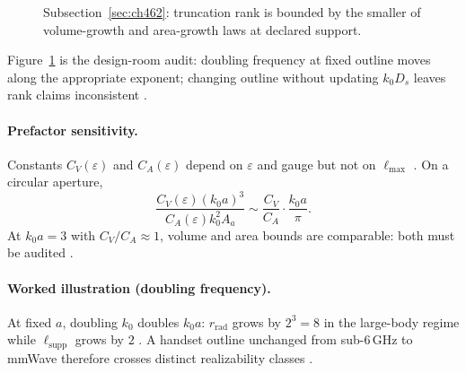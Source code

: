 \begin{figure}[t]
\centering
{}
\caption{Subsection~\ref{sec:ch462}: truncation rank is bounded by the smaller of volume-growth and area-growth laws at declared support.}
\label{fig:ch4.truncation-scaling-audit}
\end{figure}

Figure~\ref{fig:ch4.truncation-scaling-audit} is the design-room audit: doubling frequency at fixed outline moves along the appropriate
exponent; changing outline without updating \(k_{0}D_{s}\) leaves rank claims inconsistent \cite{jackson1999,harrington2001}.

\paragraph{Prefactor sensitivity.}
Constants \(C_{V}(\varepsilon)\) and \(C_{A}(\varepsilon)\) depend on \(\varepsilon\) and gauge but not on \(\ell_{\max}\)
\cite{hansen1988,stratton1941}. On a circular aperture,
\begin{equation}
\label{eq:ch4.scaling-ratio}
\frac{C_{V}(\varepsilon)(k_{0}a)^{3}}{C_{A}(\varepsilon)k_{0}^{2}A_{a}}
\sim
\frac{C_{V}}{C_{A}}\cdot\frac{k_{0}a}{\pi}.
\end{equation}
At \(k_{0}a=3\) with \(C_{V}/C_{A}\approx1\), volume and area bounds are comparable: both must be audited \cite{harrington2001,devaney2004}.

\paragraph{Worked illustration (doubling frequency).}
At fixed \(a\), doubling \(k_{0}\) doubles \(k_{0}a\): \(r_{\mathrm{rad}}\) grows by \(2^{3}=8\) in the large-body regime while
\(\ell_{\mathrm{supp}}\) grows by \(2\) \cite{jackson1999,harrington2001,hansen1988}. A handset outline unchanged from sub-6\,GHz to mmWave
therefore crosses distinct realizability classes \cite{stratton1941,collin2001}.


